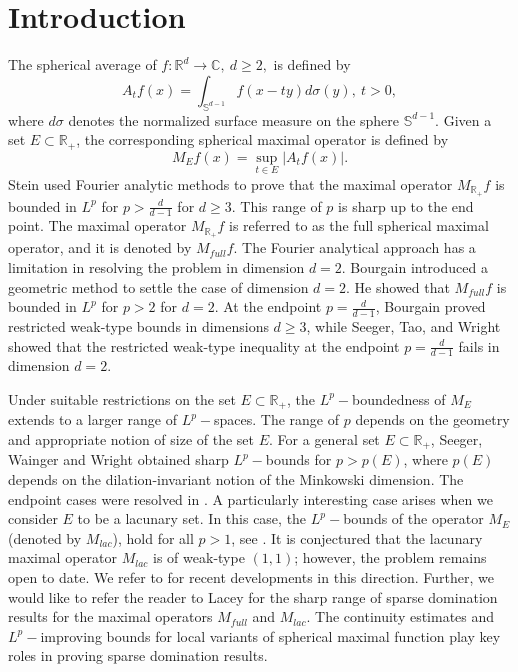 \documentclass[a4paper,reqno]{amsart}
\newcounter{old}
\numberwithin{equation}{section}
\newcommand{\R}{{\mathbb {R}}}
\newcommand{\C}{{\mathbb C}}
\begin{document}
	\section{Introduction}
	The spherical average of $f:\R^d\rightarrow \C,~d\geq 2,$ is defined by 
	\[A_tf(x)=\int_{\mathbb S^{d-1}}f(x-ty)d\sigma(y), ~t>0,\]
	where $d\sigma$ denotes the normalized surface measure on the sphere $\mathbb S^{d-1}$.
	Given a set $ E\subset \R_+$, the corresponding spherical maximal operator is defined by
	\[M_Ef(x)=\sup_{t\in E}|A_tf(x)|.\]
	Stein \cite{SphStein} used Fourier analytic methods to prove that the maximal operator $M_{\R_+}f$ is bounded in $L^p$ for $p>\frac{d}{d-1}$ for $d\geq 3$. This range of $p$ is sharp up to the end point. The maximal operator $M_{\R_+}f$  is referred to as the full spherical maximal operator, and it is denoted by $M_{full}f$. The Fourier analytical approach has a limitation in resolving the problem in dimension $d=2$. Bourgain \cite{CirBourgain} introduced a geometric method to settle the case of dimension $d=2$. He showed that $M_{full}f$ is bounded in $L^p$ for $p>2$ for $d=2$. At the endpoint $p=\frac{d}{d-1}$, Bourgain \cite{sphBourgain} proved restricted weak-type bounds in dimensions $d\geq3$, while Seeger, Tao, and Wright~\cite{STW} showed that the restricted weak-type inequality at the endpoint $p=\frac{d}{d-1}$ fails in dimension $d=2$. 
	
	Under suitable restrictions on the set $E\subset\R_+$, the $L^p-$boundedness of $M_E$ extends to a larger range of $L^p-$spaces. The range of $p$ depends on the geometry and appropriate notion of size of the set $E$. For a general set $E\subset\R_+$, Seeger, Wainger and Wright \cite{SWW1} obtained sharp $L^p-$bounds for $p>p(E)$, where $p(E)$ depends on the dilation-invariant notion of the Minkowski dimension. The endpoint cases were resolved in \cite{STW}. A particularly interesting case arises when we consider $E$ to be a lacunary set. In this case, the $L^p-$bounds of the operator $M_E$ (denoted by $M_{lac}$), hold for all $p>1$, see \cites{lacsphCalderon, CoifmanWeiss, RubioDuoandi}. It is conjectured that the lacunary maximal operator $M_{lac}$ is of weak-type $(1,1)$; however, the problem remains open to date. We refer to \cite{CladekKrause} for recent developments in this direction. Further, we would like to refer the reader to Lacey \cite{sparseLacey} for the sharp range of sparse domination results for the maximal operators $M_{full}$ and $M_{lac}$. The continuity estimates and $L^p-$improving bounds for local variants of spherical maximal function play key roles in proving sparse domination results. 
	
\end{document}
